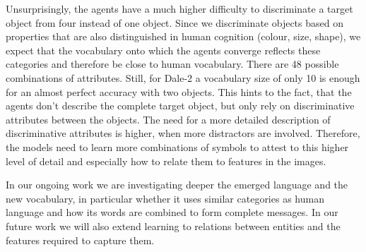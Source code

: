 \documentclass[11pt]{article}
\begin{document}
Unsurprisingly, the agents have a much higher difficulty to discriminate a target object from four instead of one object.
Since we discriminate objects based on properties that are also distinguished in human cognition (colour, size, shape), we expect that the vocabulary onto which the agents converge reflects these categories and therefore be close to human vocabulary.
There are 48 possible combinations of attributes.
Still, for Dale-2 a vocabulary size of only 10 is enough for an almost perfect accuracy with two objects.
This hints to the fact, that the agents don't describe the complete target object, but only rely on discriminative attributes between the objects.
The need for a more detailed description of discriminative attributes is higher, when more distractors are involved.
Therefore, the models need to learn more combinations of symbols to attest to this higher level of detail and especially how to relate them to features in the images.


In our ongoing work we are investigating deeper the emerged language and the new vocabulary,
in particular whether
it uses similar categories as human language and how its words are combined to form complete messages.
In our future work we will also extend learning to relations between entities and the features required to capture them.

\end{document}

